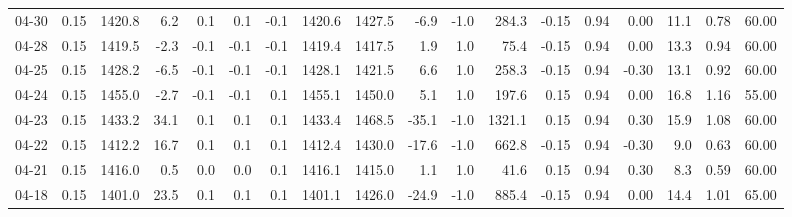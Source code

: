 \begin{threeparttable}
{\begin{tabular}{lrrrrrrrrrrrrrrrrr}
  04-30 &     0.15 & 1420.8 &               6.2 &               0.1 &                0.1 &               -0.1 & 1420.6 & 1427.5 &       -6.9 &                     -1.0 &               284.3 &      -0.15 &      0.94 &           0.00 &             11.1 &            0.78 &                  60.00 \\
  04-28 &     0.15 & 1419.5 &              -2.3 &              -0.1 &               -0.1 &               -0.1 & 1419.4 & 1417.5 &        1.9 &                      1.0 &                75.4 &      -0.15 &      0.94 &           0.00 &             13.3 &            0.94 &                  60.00 \\
  04-25 &     0.15 & 1428.2 &              -6.5 &              -0.1 &               -0.1 &               -0.1 & 1428.1 & 1421.5 &        6.6 &                      1.0 &               258.3 &      -0.15 &      0.94 &          -0.30 &             13.1 &            0.92 &                  60.00 \\
  04-24 &     0.15 & 1455.0 &              -2.7 &              -0.1 &               -0.1 &                0.1 & 1455.1 & 1450.0 &        5.1 &                      1.0 &               197.6 &       0.15 &      0.94 &           0.00 &             16.8 &            1.16 &                  55.00 \\
  04-23 &     0.15 & 1433.2 &              34.1 &               0.1 &                0.1 &                0.1 & 1433.4 & 1468.5 &      -35.1 &                     -1.0 &              1321.1 &       0.15 &      0.94 &           0.30 &             15.9 &            1.08 &                  60.00 \\
  04-22 &     0.15 & 1412.2 &              16.7 &               0.1 &                0.1 &                0.1 & 1412.4 & 1430.0 &      -17.6 &                     -1.0 &               662.8 &      -0.15 &      0.94 &          -0.30 &              9.0 &            0.63 &                  60.00 \\
  04-21 &     0.15 & 1416.0 &               0.5 &               0.0 &                0.0 &                0.1 & 1416.1 & 1415.0 &        1.1 &                      1.0 &                41.6 &       0.15 &      0.94 &           0.30 &              8.3 &            0.59 &                  60.00 \\
  04-18 &     0.15 & 1401.0 &              23.5 &               0.1 &                0.1 &                0.1 & 1401.1 & 1426.0 &      -24.9 &                     -1.0 &               885.4 &      -0.15 &      0.94 &           0.00 &             14.4 &            1.01 &                  65.00 \\

\end{tabular}}
\end{threeparttable}
